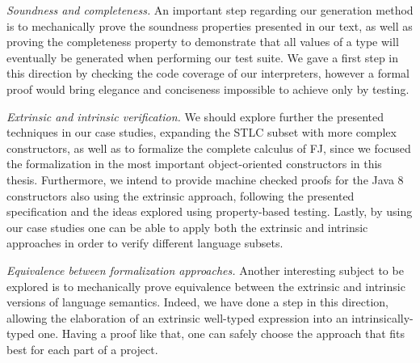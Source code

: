 \documentclass[tese,capa,english]{texufpel}
\begin{document}
\vspace{8pt}
\noindent\emph{Soundness and completeness. } An important step regarding our generation method is to mechanically prove the soundness properties presented in our text, as well as proving the completeness property to demonstrate that all values of a type will eventually be generated when performing our test suite. We gave a first step in this direction by checking the code coverage of our interpreters, however a formal proof would bring elegance and conciseness impossible to achieve only by testing.

\vspace{8pt}
\noindent\emph{Extrinsic and intrinsic verification. } We should explore further the presented techniques in our case studies, expanding the STLC subset with more complex constructors, as well as to formalize the complete calculus of FJ, since we focused the formalization in the most important object-oriented constructors in this thesis. Furthermore, we intend to provide machine checked proofs for the Java 8 constructors also using the extrinsic approach, following the presented specification and the ideas explored using property-based testing. Lastly, by using our case studies one can be able to apply both the extrinsic and intrinsic approaches in order to verify different language subsets. 

\vspace{8pt}
\noindent\emph{Equivalence between formalization approaches. } Another interesting subject to be explored is to mechanically prove equivalence between the extrinsic and intrinsic versions of language semantics. Indeed, we have done a step in this direction, allowing the elaboration of an extrinsic well-typed expression into an intrinsically-typed one. Having a proof like that, one can safely choose the approach that fits best for each part of a project.




 




\end{document}
